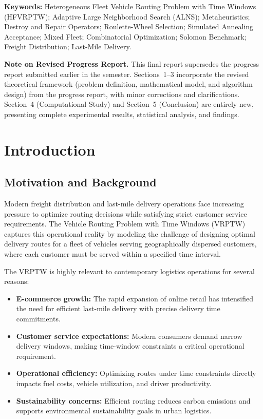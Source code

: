 \documentclass[11pt]{article}
\begin{document}
\noindent\textbf{Keywords:} Heterogeneous Fleet Vehicle Routing Problem with Time Windows (HFVRPTW); Adaptive Large Neighborhood Search (ALNS); Metaheuristics; Destroy and Repair Operators; Roulette-Wheel Selection; Simulated Annealing Acceptance; Mixed Fleet; Combinatorial Optimization; Solomon Benchmark; Freight Distribution; Last-Mile Delivery.

\newpage
\tableofcontents
\newpage

\noindent\textbf{Note on Revised Progress Report.} This final report supersedes the progress report submitted earlier in the semester. Sections~1--3 incorporate the revised theoretical framework (problem definition, mathematical model, and algorithm design) from the progress report, with minor corrections and clarifications. Section~4 (Computational Study) and Section~5 (Conclusion) are entirely new, presenting complete experimental results, statistical analysis, and findings.

\section{Introduction}

\subsection{Motivation and Background}

Modern freight distribution and last-mile delivery operations face increasing pressure to optimize routing decisions while satisfying strict customer service requirements. The Vehicle Routing Problem with Time Windows (VRPTW) captures this operational reality by modeling the challenge of designing optimal delivery routes for a fleet of vehicles serving geographically dispersed customers, where each customer must be served within a specified time interval.

The VRPTW is highly relevant to contemporary logistics operations for several reasons:
\begin{itemize}[leftmargin=*]
    \item \textbf{E-commerce growth:} The rapid expansion of online retail has intensified the need for efficient last-mile delivery with precise delivery time commitments.
    \item \textbf{Customer service expectations:} Modern consumers demand narrow delivery windows, making time-window constraints a critical operational requirement.
    \item \textbf{Operational efficiency:} Optimizing routes under time constraints directly impacts fuel costs, vehicle utilization, and driver productivity.
    \item \textbf{Sustainability concerns:} Efficient routing reduces carbon emissions and supports environmental sustainability goals in urban logistics.
\end{itemize}
\end{document}
